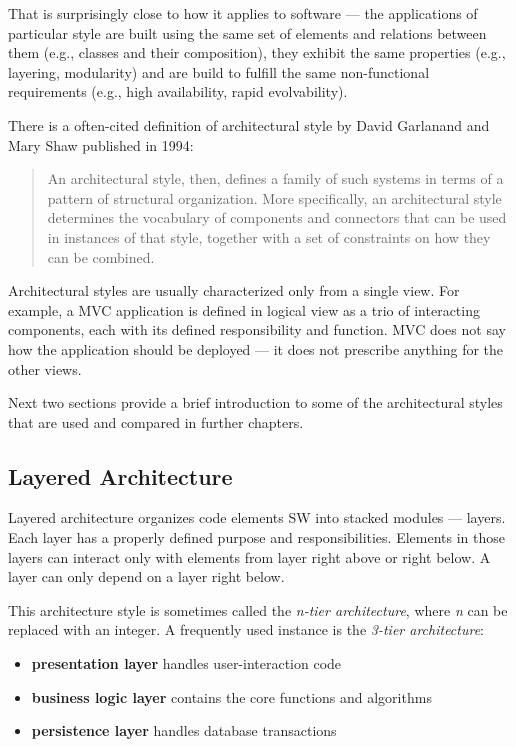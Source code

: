 \documentclass[thesis=M,english,hidelinks]{FITthesis}[2012/10/20]
\begin{document}
That is surprisingly close to how it applies to software --- the applications of particular style are built using the same set of elements and relations between them (e.g., classes and their composition), they exhibit the same properties (e.g., layering, modularity) and are build to fulfill the same non-functional requirements (e.g., high availability, rapid evolvability).

There is a often-cited definition of architectural style by David Garlanand and Mary Shaw published in 1994:
\begin{quote}
An architectural style, then, defines a family of such systems in terms of a pattern of structural organization. More specifically, an architectural style determines the vocabulary of components and connectors that can be used in instances of that style, together with a set of constraints on how they can be combined.~\cite{sa-intro-garlan-shaw}
\end{quote}

Architectural styles are usually characterized only from a single view. For example, a \acrfull{MVC} application is defined in logical view as a trio of interacting components, each with its defined responsibility and function. \acrshort{MVC} does not say how the application should be deployed --- it does not prescribe anything for the other views. 

Next two sections provide a brief introduction to some of the architectural styles that are used and compared in further chapters.

\subsection{Layered Architecture}
Layered architecture organizes code elements \acrshort{SW} into stacked modules --- layers. Each layer has a properly defined purpose and responsibilities. Elements in those layers can interact only with elements from layer right above or right below. A layer can only depend on a layer right below.

This architecture style is sometimes called the \textit{n-tier architecture}, where \textit{n} can be replaced with an integer. A frequently used instance is the \textit{3-tier architecture}:
\begin{itemize}
    \item \textbf{presentation layer} handles user-interaction code
    \item \textbf{business logic layer} contains the core functions and algorithms
    \item \textbf{persistence layer} handles database transactions
\end{itemize}
\end{document}
